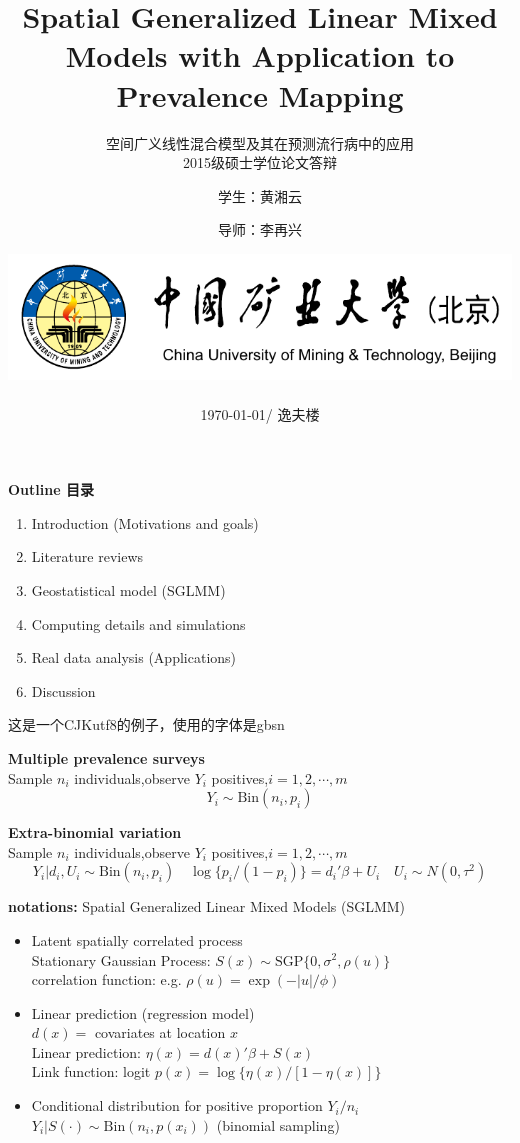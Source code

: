 \documentclass[aspectratio=43,compress]{beamer}
\title[Spatial Generalized Linear Mixed Models]{Spatial Generalized Linear Mixed Models with Application to Prevalence Mapping}
\subtitle{空间广义线性混合模型及其在预测流行病中的应用\\ 2015级硕士学位论文答辩}
\author[黄湘云 \and 李再兴]{学生：黄湘云 \and 导师：李再兴}
\institute[中国矿业大学（北京）] 
{
  专业：统计学\quad 方向：数据分析与统计计算 %
}
\date[\today] %
{\includegraphics[width=38ex,interpolate=true]{cumtb.pdf} \\ ~~\\
\today / 逸夫楼}
\begin{document}
\begin{CJK}{UTF8}{gbsn}

\maketitle


\begin{frame}

\textbf{Outline 目录}
\begin{enumerate}
  \item Introduction (Motivations and goals)
  \item Literature reviews  
  \item Geostatistical model (SGLMM)
  \item Computing details and simulations
  \item Real data analysis (Applications)
  \item Discussion
\end{enumerate}
这是一个CJKutf8的例子，使用的字体是gbsn
\end{frame}

\begin{frame}

{\color{red} \textbf{Multiple prevalence surveys}} \\
Sample $n_{i}$ individuals,observe $Y_{i}$ positives,$i=1,2,\cdots,m$
$$Y_{i}\sim \mathrm{Bin}(n_{i},p_{i})$$

{\color{red} \textbf{Extra-binomial variation}} \\
Sample $n_{i}$ individuals,observe $Y_{i}$ positives,$i=1,2,\cdots,m$
$$Y_{i}|d_{i},U_{i}\sim \mathrm{Bin}(n_{i},p_{i}) \quad 
\log\{p_{i}/(1-p_{i})\}=d_{i}'\beta+U_{i} \quad U_{i} \sim N(0,\tau^2)$$

\textbf{notations:} Spatial Generalized Linear Mixed Models (SGLMM)
\begin{itemize}
\item Latent spatially correlated process \\
Stationary Gaussian Process: $S(x) \sim \mathrm{SGP}\{0,\sigma^2,\rho(u)\} $ \\
correlation function: e.g. $\rho(u)=\exp(-|u|/\phi)$ 
\item Linear prediction (regression model)\\
$d(x)=$ covariates at location $x$\\
Linear prediction: $\eta(x)=d(x)'\beta + S(x)$ \\
Link function: logit $p(x)=\log\{\eta(x)/[1-\eta(x)]\}$ 
\item Conditional distribution for positive proportion $Y_{i}/n_{i}$\\
$Y_{i}|S(\cdot) \sim \mathrm{Bin}(n_{i},p(x_{i}))$ (binomial sampling)
\end{itemize}

\end{frame}


\end{CJK}
\end{document}
